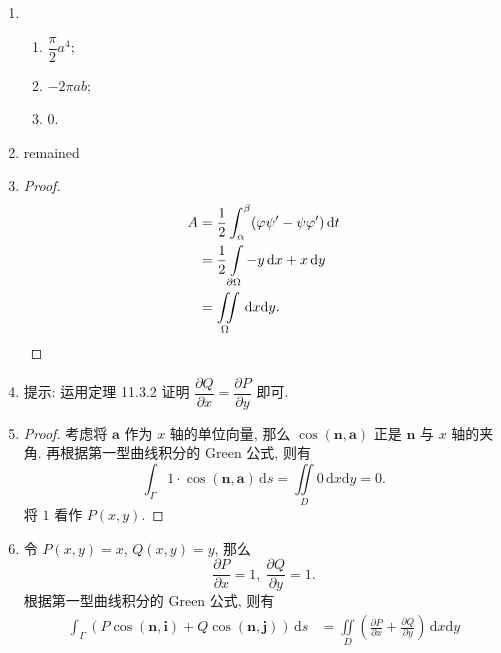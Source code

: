 % 
\begin{enumerate}
    \item %
        \begin{enumerate}[(1)]
            \item %
                $\dfrac{\pi}{2}a^4$;
            \item %
                $-2\pi ab$;
            \item %
                $0$.
        \end{enumerate}
    \item %
        {\color{red}remained}
    \item %
        \begin{proof}
            \begin{align*}
                A &= \frac12\int_\alpha^\beta(\varphi\psi' - \psi\varphi')\,\mathrm{d}t \\
                &= \frac12\int\limits_{\partial{\Omega}}-y\,\mathrm{d}x + x\,\mathrm{d}y \\
                &= \iint\limits_{\Omega}\,\mathrm{d}x\mathrm{d}y.  \qedhere 
            \end{align*}
        \end{proof}
    \item %
        提示: 运用定理 11.3.2 证明 $\dfrac{\partial{Q}}{\partial{x}} = \dfrac{\partial{P}}{\partial{y}}$ 即可.
    \item %
        \begin{proof}
            考虑将 $\boldsymbol{a}$ 作为 $x$ 轴的单位向量, 那么 $\cos(\boldsymbol{n}, \boldsymbol{a})$ 正是 $\boldsymbol{n}$ 与 $x$ 轴的夹角.
            再根据第一型曲线积分的 Green 公式, 则有
            \[
                \int_{\Gamma}1 \cdot \cos(\boldsymbol{n}, \boldsymbol{a})\,\mathrm{d}s = \iint\limits_{D}0\,\mathrm{d}x\mathrm{d}y = 0.   
            \]
            将 $1$ 看作 $P(x, y)$.
        \end{proof}
    \item %
        令 $P(x, y) = x$, $Q(x, y) = y$, 那么
        \[
            \frac{\partial{P}}{\partial{x}} = 1,\ \frac{\partial{Q}}{\partial{y}} = 1.    
        \]
        根据第一型曲线积分的 Green 公式, 则有
        \begin{align*}
            \int_{\Gamma}(P\cos(\boldsymbol{n}, \boldsymbol{i}) + Q\cos(\boldsymbol{n}, \boldsymbol{j}))\,\mathrm{d}s &= \iint\limits_{D}\left(\frac{\partial{P}}{\partial{x}} + \frac{\partial{Q}}{\partial{y}}\right)\,\mathrm{d}x\mathrm{d}y \\

\end{align*}
\end{enumerate}
